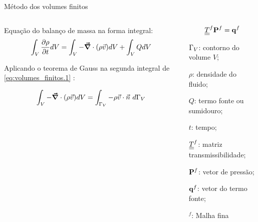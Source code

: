 \documentclass[professionalfont]{beamer}
\begin{document}
\begin{frame}{Método dos volumes finitos}

\begin{columns}
\begin{column}{0.6\textwidth}
Equação do balanço de massa na forma integral:
  \begin{equation}
	\label{eq:volumes_finitos.1}
	\int_{V} \frac{\partial \rho}{\partial t} dV = \int_{V} - \mbox{\boldmath$ \vec{\nabla} $} \cdot (\rho \vec{v}) dV + \int_{V} Q dV
\end{equation}

Aplicando o teorema de Gauss na segunda integral de \eqref{eq:volumes_finitos.1} \cite{Souza2015}:

 \begin{equation}
	 \label{eq:volumes_finitos.2}
	 \int_{V} - \mbox{\boldmath$ \vec{\nabla} $} \cdot (\rho \vec{v}) dV = \int_{\Gamma_{V}} - \rho \vec{v} \cdot \vec{n} \text{ } d \Gamma_{V}
 \end{equation}

\end{column}
\begin{column}{0.4\textwidth}  %
    \begin{equation}
        \underline{\underline{T}}^{f} \mathbf{P}^{f} = \mathbf{q}^{f}
    \end{equation}

    \begin{description}[]
        \small
        \item $\Gamma_{V}$: contorno do volume $V$;
        \item $\rho$: densidade do fluido;
        \item $Q$: termo fonte ou sumidouro;
        \item $t$: tempo;
        \item $\underline{\underline{T}}^{f}$: matriz transmissibilidade;
        \item $\mathbf{P}^{f}$: vetor de pressão;
        \item $\mathbf{q}^{f}$: vetor do termo fonte;
        \item $^{f}$: Malha fina
    \end{description}
    
\end{column}
\end{columns}



    
\end{frame}
\end{document}
